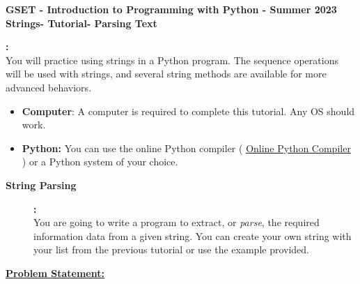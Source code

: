 \documentclass[12pt]{article}
\newcommand{\MNUM}{5} %
\newcommand{\MNAME}{Strings} %
\newcommand{\TNAME}{Parsing Text} %
\begin{document}
\thispagestyle{plain}

\begin{center}
   {\bf \large GSET - Introduction to Programming with Python - Summer 2023} \vspace{5mm}\\
   {\bf \Large \MNAME \hspc -  Tutorial\hspc\MNUM\hspc - \TNAME}\vspace{3mm}\\
   
\end{center}


\begin{description}[labelindent=1cm]
	
	\item [\textbf{ \Large Overview}] \textbf{ \Large :}\\
	You will practice using strings in a Python program. The sequence operations will be used with strings, and several string methods are available for more advanced behaviors. 	
	\item[\textbf{\underline{System Requirements:}}] \hfill \vspace{0mm}

\begin{itemize}
	\item {\bf Computer}: A computer is required to complete this tutorial. Any OS should work.
	\item {\bf Python:} You can use the online Python compiler ( \href{https://www.online-python.com/online_python_compiler}{Online Python Compiler}  ) or a Python system of your choice.
\end{itemize}

	\item[\textbf{\underline{Background:}}] \hfill \vspace{0mm}
	
	\begin{description}

	 	\item [\textbf{String Parsing }] \textbf{ \Large :}\\   

            You are going to write a program to extract, or {\it parse}, the required information data from a given string. You can create your own string with your list from the previous tutorial or use the example provided. 
      
   \item[\textbf{\underline{Problem Statement:}}] \hfill \vspace{0mm}


\end{description}
\end{description}
\end{document}
